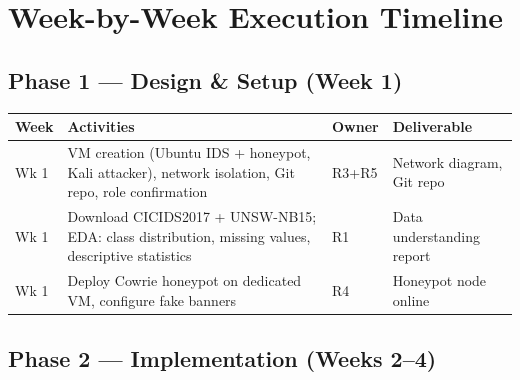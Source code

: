\documentclass[12pt,a4paper]{article}
\begin{document}
\section{Week-by-Week Execution Timeline}
\label{sec:timeline}

\subsection*{Phase 1 --- Design \& Setup (Week 1)}

\begin{table}[h!]
\centering
\small
\begin{tabular}{C{1.2cm} L{7.5cm} C{1.5cm} L{3.5cm}}
  \toprule
  \textbf{Week} & \textbf{Activities} & \textbf{Owner} & \textbf{Deliverable} \\
  \midrule
  Wk 1 & VM creation (Ubuntu IDS + honeypot, Kali attacker), network isolation, Git repo, role confirmation & R3+R5 & Network diagram, Git repo \\
  Wk 1 & Download CICIDS2017 + UNSW-NB15; EDA: class distribution, missing values, descriptive statistics & R1 & Data understanding report \\
  Wk 1 & Deploy Cowrie honeypot on dedicated VM, configure fake banners & R4 & Honeypot node online \\
  \bottomrule
\end{tabular}
\end{table}

\subsection*{Phase 2 --- Implementation (Weeks 2--4)}
\end{document}
